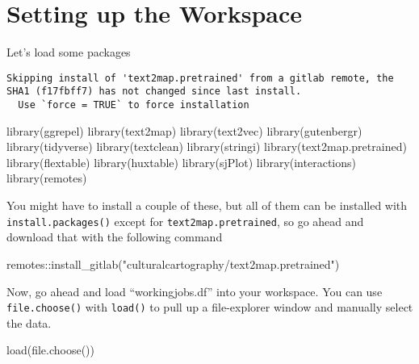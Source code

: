 \documentclass[
  letterpaper,
  DIV=11,
  numbers=noendperiod]{scrreprt}
\newenvironment{Shaded}{\begin{snugshade}}{\end{snugshade}}
\newcommand{\FunctionTok}[1]{\textcolor[rgb]{0.28,0.35,0.67}{#1}}
\newcommand{\NormalTok}[1]{\textcolor[rgb]{0.00,0.23,0.31}{#1}}
\newcommand{\SpecialCharTok}[1]{\textcolor[rgb]{0.37,0.37,0.37}{#1}}
\newcommand{\StringTok}[1]{\textcolor[rgb]{0.13,0.47,0.30}{#1}}
\begin{document}
\section{Setting up the Workspace}\label{setting-up-the-workspace}

Let's load some packages

\begin{verbatim}
Skipping install of 'text2map.pretrained' from a gitlab remote, the SHA1 (f17fbff7) has not changed since last install.
  Use `force = TRUE` to force installation
\end{verbatim}

\begin{Shaded}
\begin{Highlighting}[]
\FunctionTok{library}\NormalTok{(ggrepel)}
\FunctionTok{library}\NormalTok{(text2map)}
\FunctionTok{library}\NormalTok{(text2vec)}
\FunctionTok{library}\NormalTok{(gutenbergr)}
\FunctionTok{library}\NormalTok{(tidyverse)}
\FunctionTok{library}\NormalTok{(textclean)}
\FunctionTok{library}\NormalTok{(stringi)}
\FunctionTok{library}\NormalTok{(text2map.pretrained)}
\FunctionTok{library}\NormalTok{(flextable)}
\FunctionTok{library}\NormalTok{(huxtable)}
\FunctionTok{library}\NormalTok{(sjPlot)}
\FunctionTok{library}\NormalTok{(interactions)}
\FunctionTok{library}\NormalTok{(remotes)}
\end{Highlighting}
\end{Shaded}

You might have to install a couple of these, but all of them can be
installed with \texttt{install.packages()} except for
\texttt{text2map.pretrained}, so go ahead and download that with the
following command

\begin{Shaded}
\begin{Highlighting}[]
\NormalTok{remotes}\SpecialCharTok{::}\FunctionTok{install\_gitlab}\NormalTok{(}\StringTok{"culturalcartography/text2map.pretrained"}\NormalTok{)}
\end{Highlighting}
\end{Shaded}

Now, go ahead and load ``workingjobs.df'' into your workspace. You can
use \texttt{file.choose()} with \texttt{load()} to pull up a
file-explorer window and manually select the data.

\begin{Shaded}
\begin{Highlighting}[]
\FunctionTok{load}\NormalTok{(}\FunctionTok{file.choose}\NormalTok{())}
\end{Highlighting}
\end{Shaded}
\end{document}
